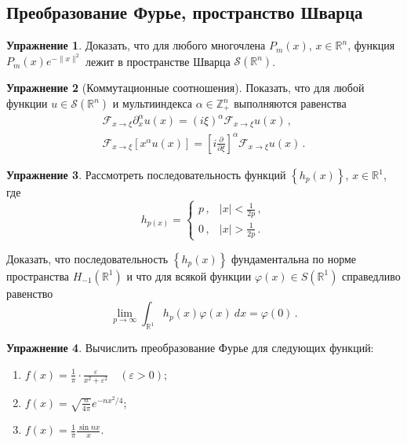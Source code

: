 \documentclass[a4paper, 12pt]{article}
\theoremstyle{definition}
\newtheorem{exercise}{Упражнение}
\begin{document}
\subsection{Преобразование Фурье, пространство Шварца} %

\begin{exercise} %
    Доказать, что для любого многочлена \({ P_{m}(x) }\), \({ x \in \mathbb R^{n} }\), функция \({ P_{m}(x) e^{-\lVert x \rVert^2} }\) лежит в пространстве Шварца \({ \mathcal S(\mathbb R^{n}) }\).
\end{exercise}

\begin{exercise}[Коммутационные соотношения]
    Показать, что для любой функции \({ u \in \mathcal S(\mathbb R^{n}) }\) и мультииндекса \({ \alpha \in \mathbb Z_{+}^{n} }\) выполняются равенства
    \[
        \begin{gathered}
            \mathcal F_{x \to \xi} \partial_{x}^{\alpha} u(x) = (i\xi)^{\alpha} \mathcal F_{x \to \xi} u(x)\,, \\
            \mathcal F_{x \to \xi} \left[ x^{\alpha} u(x) \right] = \left[ i \frac{\partial}{\partial \xi} \right]^{\alpha} \mathcal F_{x \to \xi}u(x)\,.
        \end{gathered}
    \]
\end{exercise}

\begin{exercise} %
    Рассмотреть последовательность функций \({ \left\{ h_{p}(x) \right\} }\), \({ x \in \mathbb R^{1} }\), где \[
        h_{p(x)} = \begin{cases}
            p\,, & \lvert x \rvert < \frac{1}{2p}\,, \\
            0\,, & \lvert x \rvert > \frac{1}{2p}\,.
        \end{cases}
    \]

    Доказать, что последовательность \({ \left\{ h_{p}(x) \right\} }\) фундаментальна по норме пространства \({ H_{-1}(\mathbb R^{1}) }\) и что для всякой функции \({ \varphi(x) \in S(\mathbb R^{1}) }\) справедливо равенство \[
        \lim_{p \to \infty} \int_{\mathbb R^{1}} h_{p}(x) \varphi(x)\: dx = \varphi(0)\,.
    \]
\end{exercise}

\begin{exercise} %
    Вычислить преобразование Фурье для следующих функций:
    \begin{enumerate}
        \item \({ \displaystyle f(x) = \frac{1}{\pi} \cdot \frac{\varepsilon}{x^2 + \varepsilon^2} \quad (\varepsilon > 0) }\);
        \item \({ \displaystyle f(x) = \sqrt{\frac{n}{4\pi}} e^{-n x^2 / 4} }\);
        \item \({ \displaystyle f(x) = \frac{1}{\pi} \frac{\sin nx}{x} }\).
    \end{enumerate}
\end{exercise}
\end{document}
